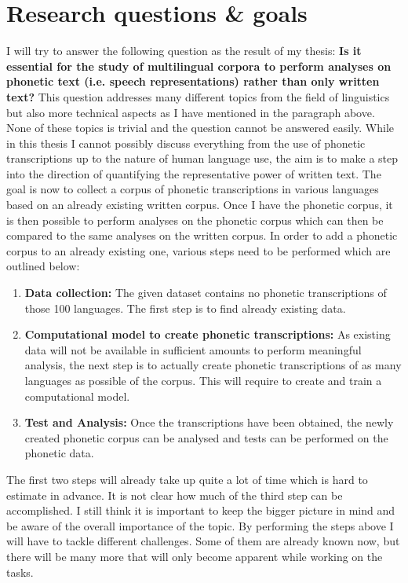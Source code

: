 \section{Research questions \& goals}
I will try to answer the following question as the result of my thesis: \textbf{Is it essential for the study of multilingual corpora to perform analyses on phonetic text (i.e. speech representations) rather than only written text?} This question addresses many different topics from the field of linguistics but also more technical aspects as I have mentioned in the paragraph above. None of these topics is trivial and the question cannot be answered easily. While in this thesis I cannot possibly discuss everything from the use of phonetic transcriptions up to the nature of human language use, the aim is to make a step into the direction of quantifying the representative power of written text. The goal is now to collect a corpus of phonetic transcriptions in various languages based on an already existing written corpus. Once I have the phonetic corpus, it is then possible to perform analyses on the phonetic corpus which can then be compared to the same analyses on the written corpus. In order to add a phonetic corpus to an already existing one, various steps need to be performed which are outlined below:
\begin{enumerate}
 \item \textbf{Data collection:} The given dataset contains no phonetic transcriptions of those 100 languages. The first step is to find already existing data. 
 \item \textbf{Computational model to create phonetic transcriptions:} As existing data will not be available in sufficient amounts to perform meaningful analysis, the next step is to actually create phonetic transcriptions of as many languages as possible of the corpus. This will require to create and train a computational model.
 \item \textbf{Test and Analysis:} Once the transcriptions have been obtained, the newly created phonetic corpus can be analysed and tests can be performed on the phonetic data.
\end{enumerate}

The first two steps will already take up quite a lot of time which is hard to estimate in advance. It is not clear how much of the third step can be accomplished. I still think it is important to keep the bigger picture in mind and be aware of the overall importance of the topic. By performing the steps above I will have to tackle different challenges. Some of them are already known now, but there will be many more that will only become apparent while working on the tasks. 

